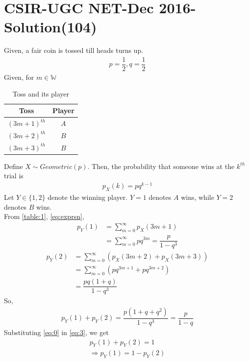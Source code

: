 \documentclass[journal,12pt,twocolumn]{IEEEtran}
\begin{document}
\section*{CSIR-UGC NET-Dec 2016-Solution(104)}
Given, a fair coin is tossed till heads turns up.
\begin{align}
\tag{104.1}
\label{eq:0}
    p=\dfrac{1}{2},q=\dfrac{1}{2}
\end{align}
Given, for $ m \in \mathbb{W}$
\begin{table}[h!]
\centering
\caption{Toss and its player}
\label{table:1}
\begin{tabular}{|c|c|}
    \hline
    Toss & Player \\
    \hline
    $(3m+1)^{th}$ & $A$\\[1ex]
    \hline
    $(3m+2)^{th}$ & $B$\\[1ex]
    \hline
    $(3m+3)^{th}$ & $B$\\[1ex]
    \hline
\end{tabular}
\end{table}
\newline
Define $X\sim Geometric(p)$. Then, the probability that someone wins at the $k^{th}$ trial is
\begin{align}
\tag{104.2}
\label{eq:exprsn}
    p_{X}(k)=pq^{k-1}
\end{align}
Let $Y \in \{ 1,2\}$ denote the winning player. $Y=1$ denotes $A$ wins, while $Y=2$ denotes $B$ wins.\\
From \eqref{table:1}, \eqref{eq:exprsn},
\begin{align}
\tag{104.3}
    p_{Y}(1)&=\displaystyle\sum_{m=0}^{\infty}p_{X}(3m+1)\\
\tag{104.4}
\label{eq:1}
    &=\displaystyle\sum_{m=0}^{\infty}pq^{3m}=\dfrac{p}{1-q^{3}}
\end{align}
\begin{align}
\tag{104.5}
    p_{Y}(2)&=\displaystyle\sum_{m=0}^{\infty}(p_{X}(3m+2)+p_{X}(3m+3))\\ 
\tag{104.6}
    &=\displaystyle\sum_{m=0}^{\infty}(pq^{3m+1}+pq^{3m+2})\\
\tag{104.7}
\label{eq:2}
    &=\dfrac{pq(1+q)}{1-q^{3}}
\end{align}
So,
\begin{align}
\tag{104.8}
\label{eq:3}
    p_{Y}(1)+p_{Y}(2)=\dfrac{p(1+q+q^{2})}{1-q^{3}}=\dfrac{p}{1-q}
\end{align}
Substituting \eqref{eq:0} in \eqref{eq:3}, we get
\begin{align}
\tag{104.9}
     p_{Y}(1)+p_{Y}(2)=1\\
\tag{104.10}
    \Rightarrow p_{Y}(1)=1-p_{Y}(2)
\end{align}
\end{document}
